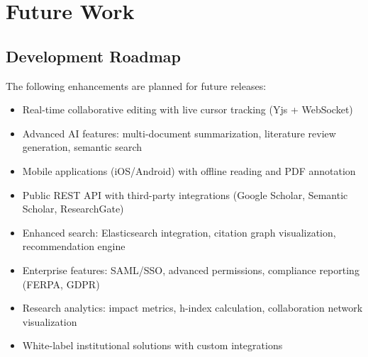 \chapter{Future Work}
\label{ch:future-work}

\section{Development Roadmap}
\label{sec:future-roadmap}

The following enhancements are planned for future releases:

\begin{itemize}
    \item Real-time collaborative editing with live cursor tracking (Yjs + WebSocket)
    
    \item Advanced AI features: multi-document summarization, literature review generation, semantic search
    
    \item Mobile applications (iOS/Android) with offline reading and PDF annotation
    
    \item Public REST API with third-party integrations (Google Scholar, Semantic Scholar, ResearchGate)
    
    \item Enhanced search: Elasticsearch integration, citation graph visualization, recommendation engine
    
    \item Enterprise features: SAML/SSO, advanced permissions, compliance reporting (FERPA, GDPR)
    
    \item Research analytics: impact metrics, h-index calculation, collaboration network visualization
    
    \item White-label institutional solutions with custom integrations
\end{itemize}
